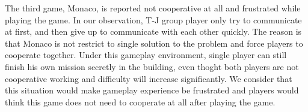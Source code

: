 The third game, Monaco, is reported not cooperative at all and frustrated while playing the game. In our observation, T-J group player only try to communicate at first, and then give up to communicate with each other quickly. The reason is that Monaco is not restrict to single solution to the problem and force players to cooperate together. Under this gameplay environment, single player can still finish his own mission secretly in the building, even thoght both players are not cooperative working and difficulty will increase significantly. We consider that this situation would make gameplay experience be frustrated and players would think this game does not need to cooperate at all after playing the game.





